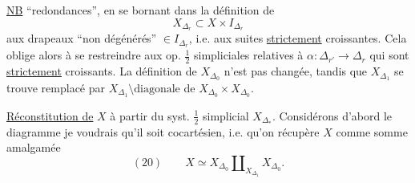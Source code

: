 \uline{NB} 
``redondances'', en se bornant dans la
définition de
\[
X_{\Delta_r}\subset X\times I_{\Delta_r}
\]
aux drapeaux ``non dégénérés''  $\in I_{\Delta_r}$,
i.e. aux suites \uline{strictement} croissantes. Cela
oblige alors à se restreindre aux op.
$\frac12$ simpliciales relatives à  $\alpha:\Delta_{r'}\longrightarrow\Delta_r$ qui
sont \uline{strictement} croissants. La définition
de $X_{\Delta_0}$ n'est pas changée, tandis que
$X_{\Delta_1}$ se trouve remplacé par $X_{\Delta_1}\setminus\text{diagonale}$
de $X_{\Delta_0}\times X_{\Delta_0}$.

\uline{Réconstitution de} $X$ à partir du syst.
$\frac12$ simplicial $X_{\Delta_*}$. Considérons d'abord
le diagramme
je voudrais qu'il soit cocartésien, i.e.
qu'on récupère $X$ comme somme amalgamée
\[
(20)\qquad X\simeq X_{\Delta_0}\amalg_{X_{\Delta_1}}X_{\Delta_0}.
\]
